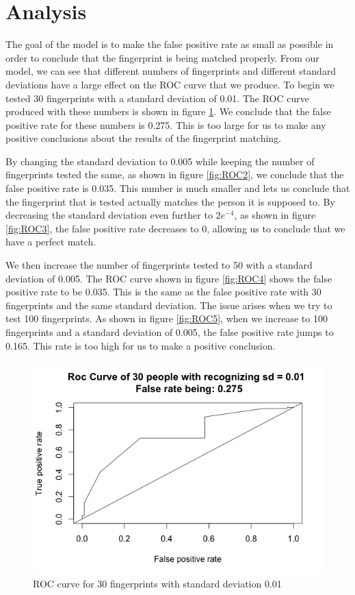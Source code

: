 \documentclass[a4paper]{article}
\begin{document}
\section{Analysis}
The goal of the model is to make the false positive rate as small as possible in order to conclude that the fingerprint is being matched properly. From our model, we can see that different numbers of fingerprints and different standard deviations have a large effect on the ROC curve that we produce. To begin we tested 30 fingerprints with a standard deviation of 0.01. The ROC curve produced with these numbers is shown in figure \ref{fig:ROC1}. We conclude that the false positive rate for these numbers is 0.275. This is too large for us to make any positive conclusions about the results of the fingerprint matching. 

By changing the standard deviation to 0.005 while keeping the number of fingerprints tested the same, as shown in figure \ref{fig:ROC2}, we conclude that the false positive rate is 0.035. This number is much smaller and lets us conclude that the fingerprint that is tested actually matches the person it is supposed to. By decreasing the standard deviation even further to $2e^{-4}$, as shown in figure \ref{fig:ROC3}, the false positive rate decreases to 0, allowing us to conclude that we have a perfect match.

We then increase the number of fingerprints tested to 50 with a standard deviation of 0.005. The ROC curve shown in figure \ref{fig:ROC4} shows the false positive rate to be 0.035. This is the same as the false positive rate with 30 fingerprints and the same standard deviation. The issue arises when we try to test 100 fingerprints. As shown in figure \ref{fig:ROC5}, when we increase to 100 fingerprints and a standard deviation of 0.005, the false positive rate jumps to 0.165. This rate is too high for us to make a positive conclusion. 


\begin{figure}
\centering
\includegraphics[width=13cm]{Roc1.png}
\caption{ROC curve for 30 fingerprints with standard deviation 0.01}
\label{fig:ROC1}
\end{figure}
\end{document}
